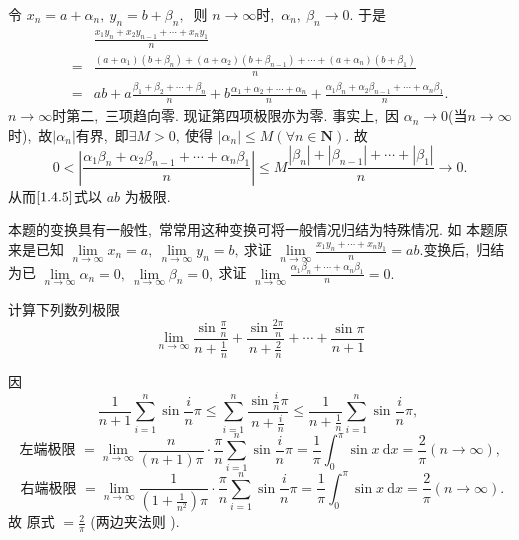 \begin{solution}
	令 $ x_{n}=a+\alpha_{n},\  y_{n}=b+\beta_{n} ,\ $ 则 $ n \rightarrow \infty  $时,\   $\alpha_{n},\  \beta_{n} \rightarrow 0 .$ 于是
	\begin{align}
		&\frac{x_{1} y_{n}+x_{2} y_{n-1}+\cdots+x_{n} y_{1}}{n}\nonumber\\
		=&\frac{\left(a+\alpha_{1}\right)\left(b+\beta_{n}\right)+\left(a+\alpha_{2}\right)\left(b+\beta_{n-1}\right)+\cdots+\left(a+\alpha_{n}\right)\left(b+\beta_{1}\right)}{n} \nonumber\\
		=&a b+a \frac{\beta_{1}+\beta_{2}+\cdots+\beta_{n}}{n}+b \frac{\alpha_{1}+\alpha_{2}+\cdots+\alpha_{n}}{n}+\frac{\alpha_{1} \beta_{n}+\alpha_{2} \beta_{n-1}+\cdots+\alpha_{n} \beta_{1}}{n} .\label{1.4.5}
	\end{align}
	$n \rightarrow \infty  $时第二,\ 三项趋向零. 现证第四项极限亦为零. 事实上,\  因  $\alpha_{n} \rightarrow 0  $(当$  n \rightarrow \infty  $时),\  故$  \left|\alpha_{n}\right|  $有界,\  即$  \exists M>0 ,\  $使得  $\left|\alpha_{n}\right| \leqslant M(\forall n \in \mathbf{N}  ).$ 故
	$$0<\left|\frac{\alpha_{1} \beta_{n}+\alpha_{2} \beta_{n-1}+\cdots+\alpha_{n} \beta_{1}}{n}\right| \leqslant M \frac{\left|\beta_{n}\right|+\left|\beta_{n-1}\right|+\cdots+\left|\beta_{1}\right|}{n} \rightarrow 0 .$$
	从而$\eqref{1.4.5}$式以 $ a b $ 为极限.
\end{solution}
\begin{note}
	本题的变换具有一般性,\  常常用这种变换可将一般情况归结为特殊情况. 如 本题原来是已知  $\lim\limits_{n \rightarrow \infty} x_{n}=a,\  \lim\limits_{n \rightarrow \infty} y_{n}=b ,\  $求证  $\lim\limits_{n \rightarrow \infty} \frac{x_{1} y_{n}+\cdots+x_{n} y_{1}}{n}=a b . $变换后,\  归结为已 $ \lim\limits_{n \rightarrow \infty} \alpha_{n}=0,\  \lim\limits_{n \rightarrow \infty} \beta_{n}=0 ,\  $求证  $\lim\limits_{n \rightarrow \infty} \frac{\alpha_{1} \beta_{n}+\cdots+\alpha_{n} \beta_{1}}{n}=0 .$
\end{note}
\newpage
\begin{problem}
	计算下列数列极限
	$$\lim\limits_{n\rightarrow\infty}\frac{\sin \frac{\pi}{n}}{n+\frac{1}{n}}+\frac{\sin \frac{2 \pi}{n}}{n+\frac{2}{n}}+\cdots+\frac{\sin \pi}{n+1}$$
\end{problem}
\begin{solution}
	因
	$$\frac{1}{n+1} \sum\limits_{i=1}^{n} \sin \frac{i}{n} \pi \leqslant \sum\limits_{i=1}^{n} \frac{\sin \frac{i}{n} \pi}{n+\frac{i}{n}} \leqslant \frac{1}{n+\frac{1}{n}} \sum\limits_{i=1}^{n}\sin\frac{i}{n}\pi,\ $$
	$$\text { 左端极限 }=\lim\limits_{n \rightarrow \infty}\frac{n}{(n+1) \pi} \cdot \frac{\pi}{n} \sum_{i=1}^{n} \sin \frac{i}{n} \pi=\frac{1}{\pi} \int_{0}^{\pi} \sin x \mathrm{~d} x=\frac{2}{\pi}(n \rightarrow \infty),\ $$
	$$\text { 右端极限 }=\lim\limits_{n \rightarrow \infty} \frac{1}{\left(1+\frac{1}{n^{2}}\right) \pi} \cdot \frac{\pi}{n} \sum_{i=1}^{n} \sin \frac{i}{n} \pi=\frac{1}{\pi} \int_{0}^{\pi} \sin x \mathrm{~d} x=\frac{2}{\pi}(n \rightarrow \infty).$$
	故
	原式 $ =\frac{2}{\pi} $ (两边夹法则 ).
\end{solution}
